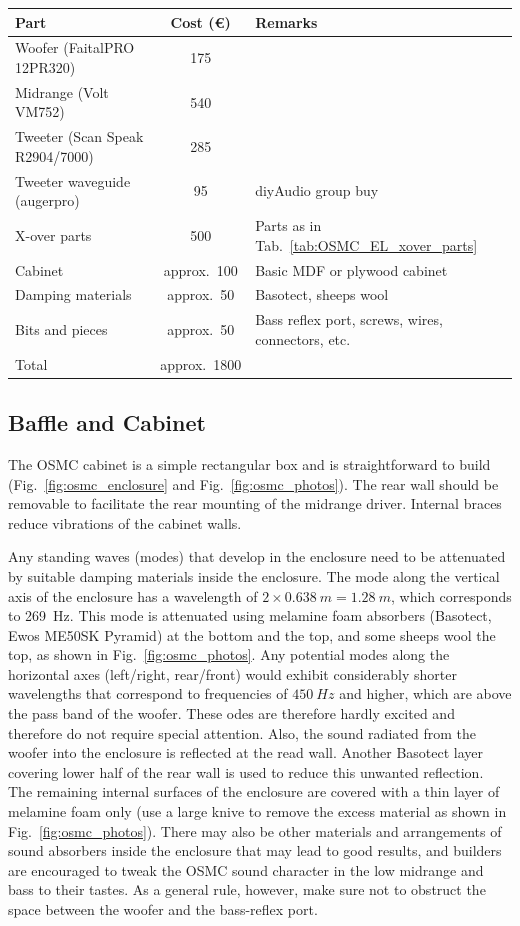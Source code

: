 \documentclass[12pt,a4paper]{article}
\providecommand{\figr}[1]{Fig.~\ref{fig:#1}}
\providecommand{\tabl}[1]{Tab.~\ref{tab:#1}}
\begin{document}
\begin{tabular}{lcp{}} 
\toprule
Part & Cost (\euro) & Remarks\\ 
\midrule 
Woofer (FaitalPRO 12PR320)	&	175	\\
Midrange (Volt VM752)		&	540 \\
Tweeter (Scan Speak R2904/7000)	&	285	\\
Tweeter waveguide (augerpro)	&	95	& diyAudio group buy\cite{augerpro_groupbuy} \\
X-over parts			&	500	& Parts as in \tabl{OSMC_EL_xover_parts} \\
Cabinet				&	approx.~100	& Basic MDF or plywood cabinet \\
Damping materials		&	approx.~50	& Basotect, sheeps wool \\
Bits and pieces			&	approx.~50 	& Bass reflex port, screws, wires, connectors, etc. \\
\midrule 
Total				&	approx.~1800 \\
\bottomrule
\end{tabular}


\subsection{Baffle and Cabinet}
The OSMC cabinet is a simple rectangular box and is straightforward to build (\figr{osmc_enclosure} and \figr{osmc_photos}). The rear wall should be removable to facilitate the rear mounting of the midrange driver. Internal braces reduce vibrations of the cabinet walls.\par

Any standing waves (modes) that develop in the enclosure need to be attenuated by suitable damping materials inside the enclosure. The mode along the vertical axis of the enclosure has a wavelength of $2 \times \SI{0.638}{m} = \SI{1.28}{m}$, which corresponds to \SI{269}{Hz}. This mode is attenuated using melamine foam absorbers (Basotect, Ewos ME50SK Pyramid) at the bottom and the top, and some sheeps wool the top, as shown in \figr{osmc_photos}. Any potential modes along the horizontal axes (left/right, rear/front) would exhibit considerably shorter wavelengths that correspond to frequencies of $\SI{450}{Hz}$ and higher, which are above the pass band of the woofer. These odes are therefore hardly excited and therefore do not require special attention. Also, the sound radiated from the woofer into the enclosure is reflected at the read wall. Another Basotect layer covering lower half of the rear wall is used to reduce this unwanted reflection. The remaining internal surfaces of the enclosure are covered with a thin layer of melamine foam only (use a large knive to remove the excess material as shown in \figr{osmc_photos}). There may also be other materials and arrangements of sound absorbers inside the enclosure that may lead to good results, and builders are encouraged to tweak the OSMC sound character in the low midrange and bass to their tastes. As a general rule, however, make sure not to obstruct the space between the woofer and the bass-reflex port.
\end{document}
